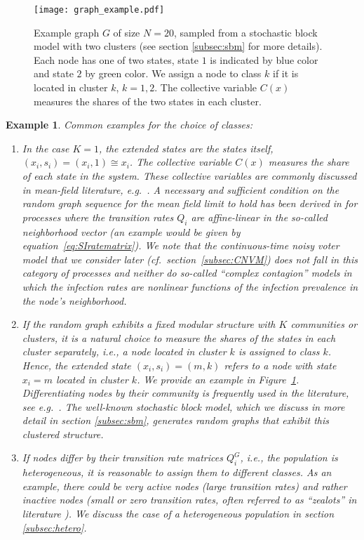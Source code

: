 \documentclass[a4paper,
               10pt,
               pdftex,
               normalheadings,
               headsepline,
               footsepline,
               headinclude,
               footinclude,
               DIV=14,
               abstracton]
{scrartcl}
\newtheorem{example}[theorem]{Example}
\begin{document}
\begin{figure}
\centering
\texttt{[image: graph\_example.pdf]}
\caption{Example graph $G$ of size $N=20$, sampled from a stochastic block model with two clusters (see section \ref{subsec:sbm} for more details). Each node has one of two states, state $1$ is indicated by blue color and state $2$ by green color. We assign a node to class $k$ if it is located in cluster $k$, $k=1,2$. The collective variable $C(x)$ measures the shares of the two states in each cluster.}
\label{fig:illustration}
\end{figure}

\begin{example} \label{example:common_species}
Common examples for the choice of classes:
\begin{enumerate}
    \item In the case $K=1$, the extended states are the states itself, $(x_i, s_i) = (x_i, 1) \cong x_i$. The collective variable $C(x)$ measures the share of each state in the system. These collective variables are commonly discussed in mean-field literature, e.g.~\cite{slanina2003analytical}.
    A necessary and sufficient condition on the random graph sequence for the mean field limit to hold has been derived in \cite{keliger2021_quasi} for processes where the transition rates $Q_i$ are affine-linear in the so-called neighborhood vector (an example would be given by equation~\eqref{eq:SIratematrix}). We note that the continuous-time noisy voter model that we consider later (cf.\ section~\ref{subsec:CNVM}) does not fall in this category of processes and neither do so-called ``complex contagion'' models in which the infection rates are nonlinear functions of the infection prevalence in the node's neighborhood.
    \item If the random graph exhibits a fixed modular structure with $K$ communities or clusters, it is a natural choice to measure the shares of the states in each cluster separately, i.e., a node located in cluster $k$ is assigned to class $k$. Hence, the extended state $(x_i, s_i) = (m, k)$ refers to a node with state $x_i = m$ located in cluster $k$.
    We provide an example in Figure~\ref{fig:illustration}.
    Differentiating nodes by their community is frequently used in the literature, see e.g.~\cite{Khalil2018, niemann2021a, Helfmann2021a}.
    The well-known stochastic block model, which we discuss in more detail in section \ref{subsec:sbm}, generates random graphs that exhibit this clustered structure. 
    \item If nodes differ by their transition rate matrices $Q_i^G$, i.e., the population is heterogeneous, it is reasonable to assign them to different classes. As an example, there could be very active nodes (large transition rates) and rather inactive nodes (small or zero transition rates, often referred to as ``zealots'' in literature \cite{huo2019zealot, Khalil2018, Chinellato2015}). We discuss the case of a heterogeneous population in section \ref{subsec:hetero}.

\end{enumerate}
\end{example}
\end{document}
